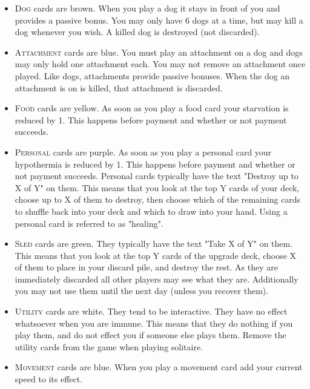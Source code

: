 \documentclass{article}
\begin{document}
\begin{multicols}{3}
    \begin{itemize}
        \setlength\itemsep{-0.8ex}
        \item \textsc{Dog} cards are brown. When you play a dog it stays in front of you
            and provides a passive bonus. You may only have 6 dogs at a time,
            but may kill a dog whenever you wish. A killed dog is destroyed (not
            discarded).

        \item \textsc{Attachment} cards are blue. You must play an attachment on a dog
            and dogs may only hold one attachment each. You may not remove an
            attachment once played. Like dogs, attachments provide passive
            bonuses. When the dog an attachment is on is killed, that attachment
            is discarded.

        \item \textsc{Food} cards are yellow. As soon as you play a food card your
            starvation is reduced by 1. This happens before payment and whether
            or not payment succeeds.

        \item \textsc{Personal} cards are purple. As soon as you play a personal card
            your hypothermia is reduced by 1. This happens before payment and
            whether or not payment succeeds. Personal cards typically have the
            text "Destroy up to X of Y" on them. This means that you look at the
            top Y cards of your deck, choose up to X of them to destroy, then
            choose which of the remaining cards to shuffle back into your deck
            and which to draw into your hand. Using a personal card is referred
            to as "healing".

        \item \textsc{Sled} cards are green. They typically have the text "Take X of Y"
            on them. This means that you look at the top Y cards of the upgrade
            deck, choose X of them to place in your discard pile, and destroy
            the rest. As they are immediately discarded all other players may
            see what they are. Additionally you may not use them until the next
            day (unless you recover them).

        \item \textsc{Utility} cards are white. They tend to be interactive. They have no
            effect whatsoever when you are immune. This means that they do
            nothing if you play them, and do not effect you if someone else
            plays them. Remove the utility cards from the game when playing
            solitaire.

        \item \textsc{Movement} cards are blue. When you play a movement card add your
            current speed to its effect.
    \end{itemize}

\end{multicols}
\end{document}

